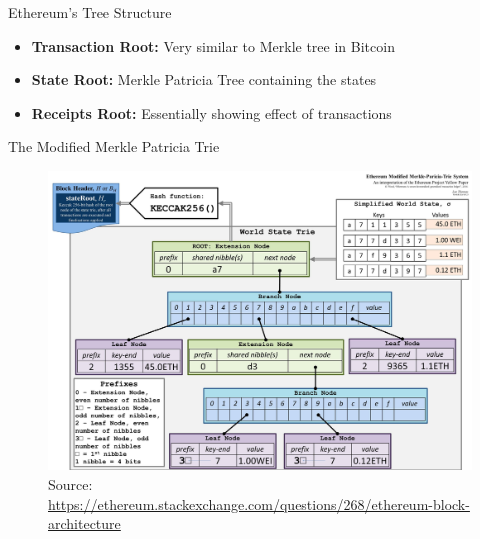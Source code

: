 \documentclass[]{beamer}
\begin{document}
\begin{frame}{Ethereum’s Tree Structure}
\vspace{1em}
\vspace{1em}
\begin{itemize}
	\item<2-> \textbf{Transaction Root:} Very similar to Merkle tree in Bitcoin
	\item<3-> \textbf{State Root:} Merkle Patricia Tree containing the states
	\item<4-> \textbf{Receipts Root:} Essentially showing effect of transactions
\end{itemize}

\end{frame}

\begin{frame}{The Modified Merkle Patricia Trie}
\vspace{1em}
\captionsetup[figure]{font=tiny,labelformat=empty}
\begin{figure}[htp]
\centering
\includegraphics[scale= 0.5]{../assets/images/modified_merkle_patricia_state_tree.jpg}
      \caption{{\tiny Source: \link \url{https://ethereum.stackexchange.com/questions/268/ethereum-block-architecture}}}\label{fig:2}
\end{figure}

		
\end{frame}
\end{document}
